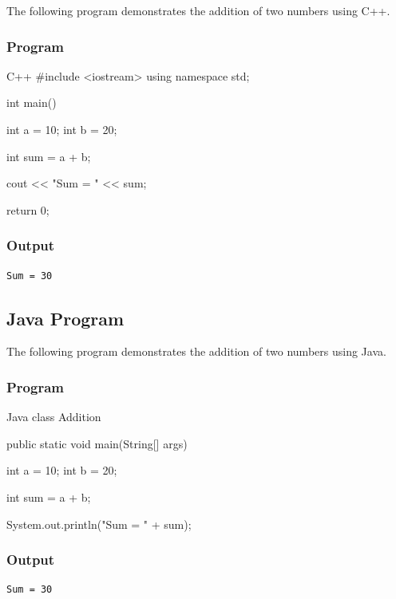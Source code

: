 The following program demonstrates the addition of two numbers
using C++.

\subsubsection{Program}

\begin{code}{C++}
#include <iostream>
using namespace std;

int main()
{
    int a = 10;
    int b = 20;

    int sum = a + b;

    cout << "Sum = " << sum;

    return 0;
}
\end{code}

\subsubsection{Output}

\begin{verbatim}
Sum = 30
\end{verbatim}



\subsection{Java Program}

The following program demonstrates the addition of two numbers
using Java.

\subsubsection{Program}

\begin{code}{Java}
class Addition
{
    public static void main(String[] args)
    {
        int a = 10;
        int b = 20;

        int sum = a + b;

        System.out.println("Sum = " + sum);
    }
}
\end{code}

\subsubsection{Output}

\begin{verbatim}
Sum = 30
\end{verbatim}


